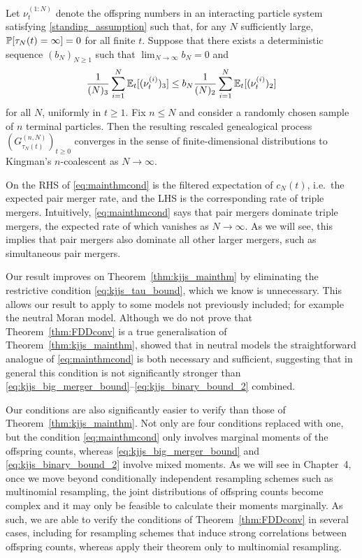 \begin{theorem}\label{thm:FDDconv}
Let $\nu_t^{(1:N)}$ denote the offspring numbers in an interacting particle system satisfying \ref{standing_assumption} such that, for any $N$ sufficiently large, $\mathbb{P}[ \tau_N(t) = \infty ] =0$ for all finite $t$. Suppose that there exists a deterministic sequence $(b_N)_{N\geq1}$ such that ${\lim}_{N\to\infty} b_N =0$ and
\begin{equation}\label{eq:mainthmcond}
\frac{1}{(N)_3} \sum_{i = 1}^N \mathbb{E}_t[ (\nu_t^{(i)})_3 ]  \leq b_N \frac{1}{(N)_2} \sum_{i = 1}^N \mathbb{E}_t[ (\nu_t^{(i)})_2 ]
\end{equation}
for all $N$, uniformly in $t \geq 1$.
Fix $n\leq N$ and consider a randomly chosen sample of $n$ terminal particles.
Then the resulting rescaled genealogical process $(G_{\tau_N(t)}^{(n,N)})_{t\geq0}$ converges in the sense of finite-dimensional distributions to Kingman's $n$-coalescent as $N \to \infty$.
\end{theorem}

On the RHS of \eqref{eq:mainthmcond} is the filtered expectation of $c_N(t)$, i.e.\ the expected pair merger rate, and the LHS is the corresponding rate of triple mergers. Intuitively, \eqref{eq:mainthmcond} says that pair mergers dominate triple mergers, the expected rate of which vanishes as $N\to\infty$. As we will see, this implies that pair mergers also dominate all other larger mergers, such as simultaneous pair mergers.

Our result improves on Theorem~\ref{thm:kjjs_mainthm} by eliminating the restrictive condition \eqref{eq:kjjs_tau_bound}, which 
we know is unnecessary. This allows our result to apply to some models not previously included; for example the neutral Moran model. %
Although we do not prove that Theorem~\ref{thm:FDDconv} is a true generalisation of Theorem~\ref{thm:kjjs_mainthm}, \textcite[Theorem 5.4]{mohle2003} showed that in neutral models the straightforward analogue of \eqref{eq:mainthmcond} is both necessary and sufficient, suggesting that in general this condition is not significantly stronger than \eqref{eq:kjjs_big_merger_bound}--\eqref{eq:kjjs_binary_bound_2} combined.

Our conditions are also significantly easier to verify than those of Theorem~\ref{thm:kjjs_mainthm}. Not only are four conditions replaced with one, but the condition \eqref{eq:mainthmcond} only involves marginal moments of the offspring counts, whereas \eqref{eq:kjjs_big_merger_bound} and \eqref{eq:kjjs_binary_bound_2} involve mixed moments. 
As we will see in Chapter~4, once we move beyond conditionally independent resampling schemes such as multinomial resampling, the joint distributions of offspring counts become complex and it may only be feasible to calculate their moments marginally. 
As such, we are able to verify the conditions of Theorem~\ref{thm:FDDconv} in several cases, including for resampling schemes that induce strong correlations between offspring counts, whereas \textcite{koskela2018} apply their theorem only to multinomial resampling.

